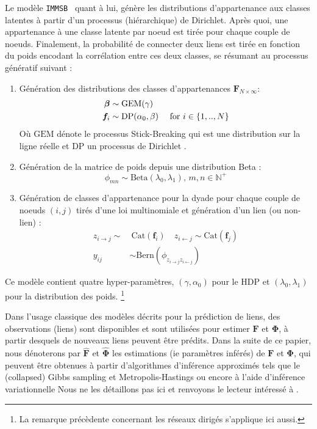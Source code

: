 \documentclass[french]{hermes-journal}
\renewcommand{\text}{\textnormal}
\newcommand{\immsb}{\texttt{IMMSB}}
\newcommand{\gem}{\mathrm{GEM}}
\newcommand{\DP}{\mathrm{DP}}
\newcommand{\mat}[1]{\bm{#1}}
\begin{document}
Le modèle \immsb~ quant à lui, génère les distributions d'appartenance aux classes latentes à partir d'un processus (hiérarchique) de Dirichlet. Après quoi, une appartenance à une classe latente par noeud est tirée pour chaque couple de noeuds. Finalement, la probabilité de connecter deux liens est tirée en fonction du poids encodant la corrélation entre ces deux classes, se résumant au processus génératif suivant :
\begin{enumerate}
\item Génération des distributions des classes d'appartenances $\mat{F}_{N \times \infty}$:
   \begin{align}
       \bm{\beta} &\sim \gem(\gamma) \nonumber \\
    \mat{f}_i &\sim \DP(\alpha_0, \beta) \quad\text{ for }  i \in \{1, .., N\} \nonumber
   \end{align}  Où $\gem$ dénote le processus Stick-Breaking qui est une distribution sur la ligne réelle et $\DP$ un processus de Dirichlet \cite{HDP}.
\item Génération de la matrice de poids depuis une distribution Beta :\\
\[ \phi_{mn} \sim \mathrm{Beta}(\lambda_0,\lambda_1), \, m,n \in \mathbb{N}^{+} \]
\item Génération de classes d'appartenance pour la dyade pour chaque couple de noeuds $(i,j)$ tirés d'une loi multinomiale et génération d'un lien (ou non-lien) : 
   \begin{align}
       z_{i \rightarrow j} \sim&\ \mbox{Cat}(\mat{f}_i) \quad z_{i \leftarrow j} \sim \mbox{Cat}(\mat{f}_j) \nonumber \\
       y_{ij} &\sim \mathrm{Bern}(\phi_{z_{i \rightarrow j}z_{i \leftarrow j}}) \nonumber
    \label{eq:link-immsb}
   \end{align}
\end{enumerate}


Ce modèle contient quatre hyper-paramètres, $(\gamma, \alpha_0)$ pour le HDP et $(\lambda_0, \lambda_1)$ pour la distribution des poids. \footnote{La remarque précèdente concernant les réseaux dirigés s'applique ici aussi.}

Dans l'usage classique des modèles décrits pour la prédiction de liens, des observations (liens) sont disponibles et sont utilisées pour estimer  $\mat{F}$ et $\mat{\Phi}$, à partir desquels de nouveaux liens peuvent être prédits. Dans la suite de ce papier, nous dénoterons par $\mat{\hat{F}}$ et $\mat{\hat{\Phi}}$ les estimations (ie paramètres inférés) de $\mat{F}$ et $\mat{\Phi}$, qui peuvent être obtenues à partir d'algorithmes d'inférence approximés tels que le (collapsed) Gibbs sampling et Metropolis-Hastings ou encore à l'aide d'inférence variationnelle Nous ne les détaillons pas ici et renvoyons le lecteur intéressé à \cite{ILFRM,IBP,HDP,fan2015dynamic}.
\end{document}
